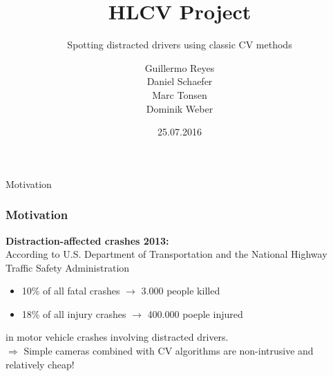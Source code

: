 \documentclass{beamer}
\title{HLCV Project}
\subtitle{Spotting distracted drivers using classic CV methods}
\author[Reyes, Schaefer, Tonsen, Weber]{Guillermo Reyes \\
	 Daniel Schaefer \\
	 Marc Tonsen \\
 Dominik Weber\\}
\institute[]{Saarland University}
\date{25.07.2016}
\begin{document}
	\begin{frame}
		\titlepage
	\end{frame}


    \begin{frame}{Motivation}
		\frametitle{Motivation}
        \textbf{Distraction-affected crashes 2013:}\\
        \vspace{0.5cm}
        According to U.S. Department of Transportation and the National Highway Traffic Safety Administration \cite{knuthwebsite}
		\begin{itemize}
            \item 10\% of all fatal crashes $\rightarrow$ 3.000 people killed
			\item 18\% of all injury crashes $\rightarrow$ 400.000 poeple injured
		\end{itemize}
        in motor vehicle crashes involving distracted drivers.\\
		\vspace{0.5cm}
		$\Rightarrow$ Simple cameras combined with CV algorithms are non-intrusive and relatively cheap! %
	\end{frame}
	
\end{document}
